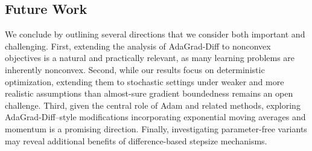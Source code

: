 \documentclass[11pt]{article}
\theoremstyle{plain}
\theoremstyle{definition}
\theoremstyle{remark}
\begin{document}
\subsection{Future Work}
We conclude by outlining several directions that we consider both important and challenging.
First, extending the analysis of AdaGrad-Diff to nonconvex objectives is a natural and practically relevant, as many learning problems are inherently nonconvex. Second, while our results focus on deterministic optimization, extending them to stochastic settings under weaker and more realistic assumptions than almost-sure gradient boundedness remains an open challenge. Third, given the central role of Adam and related methods, exploring AdaGrad-Diff–style modifications incorporating exponential moving averages and momentum is a promising direction. Finally, investigating parameter-free variants may reveal additional benefits of difference-based stepsize mechanisms.


\label{sec:disc}
\end{document}
